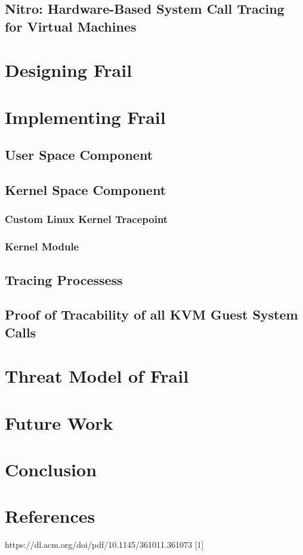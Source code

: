 \documentclass{report}
\begin{document}
\begin{spacing}{1.5}
{}

\section{Nitro: Hardware-Based System Call Tracing for Virtual Machines}

\chapter{Designing Frail}
\chapter{Implementing Frail}

\section{User Space Component}
\section{Kernel Space Component}
\subsection{Custom Linux Kernel Tracepoint}
\subsection{Kernel Module}
\section{Tracing Processess}
\section{Proof of Tracability of all KVM Guest System Calls}

\chapter{Threat Model of Frail}


\chapter{Future Work}

\chapter{Conclusion}

\chapter{References}

https://dl.acm.org/doi/pdf/10.1145/361011.361073 [1]

\end{spacing}
\end{document}

